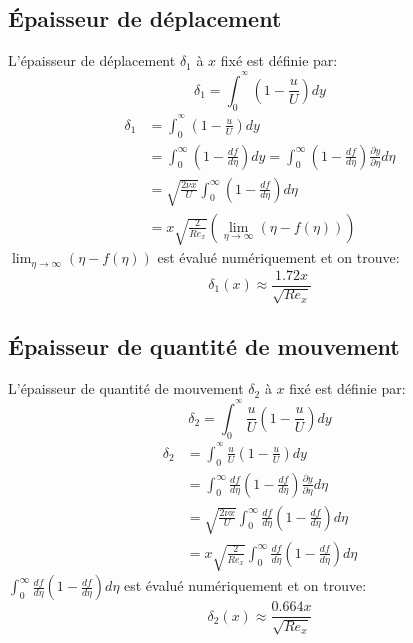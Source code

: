 \documentclass[french]{article}
\begin{document}
\subsection{Épaisseur de déplacement}
L'épaisseur de déplacement $\delta_{1}$ à $x$ fixé est définie par:
\begin{equation}
	\delta_{1} = 
	\int_{0}^{^\infty}
	\left(
	1 - 
	\frac{u}{U}
	\right)
	dy
\end{equation}
\begin{align*}
	\delta_{1} &= 
	\int_{0}^{^\infty}
	\left(
	1 - 
	\frac{u}{U}
	\right)
	dy\\
	&= \int_{0}^{\infty}
	\left(
	1 - \frac{df}{d\eta}
	\right)
	dy 
	= \int_{0}^{\infty}
	\left(
	1 - \frac{df}{d\eta}
	\right)
	\frac{\partial y}{\partial \eta}d\eta\\
	&= \sqrt{\frac{2\nu x}{U}}
	\int_{0}^{\infty}
	\left(
	1 - \frac{df}{d\eta}
	\right)
	d\eta\\
	&= x\sqrt{\frac{2}{Re_{x}}}
	\left(
	\lim_{\eta\to\infty}
	\left(
	\eta - f(\eta)
	\right)
	\right)
\end{align*}
$ \lim_{\eta\to\infty}\left(\eta - f(\eta)\right)$ est évalué numériquement et on trouve:
\begin{equation}
	\delta_{1}(x)	\approx \frac{1.72x}{\sqrt{Re_{x}}}
\end{equation}
\subsection{Épaisseur de quantité de mouvement}
L'épaisseur de quantité de mouvement $\delta_{2}$ à $x$ fixé est définie par:
\begin{equation}
	\delta_{2} = 
	\int_{0}^{^\infty}
	\frac{u}{U}
	\left(
	1 - 
	\frac{u}{U}
	\right)
	dy
\end{equation}
\begin{align*}
	\delta_{2} &= 
	\int_{0}^{^\infty}
	\frac{u}{U}
	\left(
	1 - 
	\frac{u}{U}
	\right)
	dy\\
	&= \int_{0}^{\infty}
	\frac{df}{d\eta}
	\left(
	1 - \frac{df}{d\eta}
	\right)
	\frac{\partial y}{\partial \eta}d\eta\\
	&= \sqrt{\frac{2\nu x}{U}}
	\int_{0}^{\infty}
	\frac{df}{d\eta}
	\left(
	1 - \frac{df}{d\eta}
	\right)d\eta\\
	&= x\sqrt{\frac{2}{Re_{x}}}
	\int_{0}^{\infty}
	\frac{df}{d\eta}
	\left(
	1 - \frac{df}{d\eta}
	\right)d\eta
\end{align*}
$ \int_{0}^{\infty}
\frac{df}{d\eta}
\left(1 - \frac{df}{d\eta}\right)d\eta$ est évalué numériquement et on trouve:
\begin{equation}
	\delta_{2}(x)	\approx \frac{0.664x}{\sqrt{Re_{x}}}
\end{equation}
\end{document}
